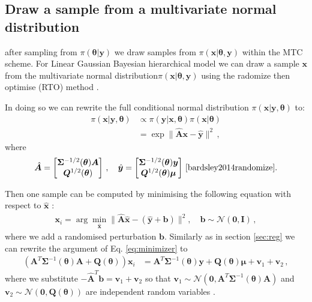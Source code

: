 \subsection{Draw a sample from a multivariate normal distribution \label{subsec:RTO}}

after sampling from $\pi(\bm{\theta}| \bm{y})$ we draw samples from $\pi(\bm{x}|\bm{\theta}, \bm{y}) $ within the MTC scheme.
For Linear Gaussian Bayesian hierarchical model we can draw a sample $\bm{x}$ from the multivariate normal distribution$\pi(\bm{x}|\bm{\theta}, \bm{y})$  using the radomize then optimise (RTO) method \cite{bardsley2012mcmc}.

In doing so we can rewrite the full conditional normal distribution $\pi( \bm{x}| \bm{y} , \bm{\theta} )$ to:
\begin{align}
	\pi(\bm{x}|\bm{y}, \bm{\theta} ) &\propto \pi(\bm{y} | \bm{x} , \bm{\theta} ) \pi(\bm{x}| \bm{\theta}) \\
	&= \exp  \lVert \hat{\bm{A}} \bm{x} - \hat{\bm{y}} \rVert^2 \, ,
\end{align}
where 
\begin{align}
	\label{eq:minimizer}
	\hat{\bm{A}} = 
	\begin{bmatrix}
		\bm{\Sigma}^{-1/2}(\bm{\theta})  \bm{A}\\
		\bm{Q}^{1/2}(\bm{\theta}) 
	\end{bmatrix} \, , \quad \hat{\bm{y}} = 
	\begin{bmatrix}
		\bm{\Sigma}^{-1/2}(\bm{\theta})  \bm{y} \\
		\bm{Q}^{1/2}(\bm{\theta}) \bm{\mu}
	\end{bmatrix} \, \text{\cite{bardsley2014randomize}}.
\end{align}

Then one sample can be computed by minimising the following equation with respect to $\hat{\bm{x}}$ :
\begin{align}
	\bm{x}_i = \arg \min_{\hat{\bm{x}}} \lVert \hat{\bm{A}} \hat{\bm{x}} - ( \hat{\bm{y}} + \bm{b} ) \rVert^2 , \quad \bm{b} \sim \mathcal{N}(\bm{0}, \mathbf{I}) \, ,
\end{align}
where we add a randomised perturbation $\bm{b}$.
Similarly as in section \ref{sec:reg} we can rewrite the argument of Eq. \ref{eq:minimizer} to 
\begin{align}
	\label{eq:RTO}
	(\bm{A}^T \bm{\Sigma}^{-1}(\bm{\theta}) \bm{A}+
	\bm{Q}(\bm{\theta}) ) \bm{x}_i &= \bm{A}^T \bm{\Sigma}^{-1}(\bm{\theta}) \bm{y} +  \bm{Q}(\bm{\theta}) \bm{\mu} + \bm{v}_1 + \bm{v}_2 \,  ,
\end{align}
where we substitute $ - \hat{\bm{A}}^T  \bm{b}  = \bm{v}_1 + \bm{v}_2$ so that $\bm{v}_1 \sim \mathcal{N}(\bm{0}, \bm{A}^T \bm{\Sigma}^{-1}(\bm{\theta}) \bm{A}) $ and $\bm{v}_2 \sim \mathcal{N}(\bm{0}, \bm{Q}(\bm{\theta}) )$ are independent random variables \cite{bardsley2012mcmc, fox2016fast}.


